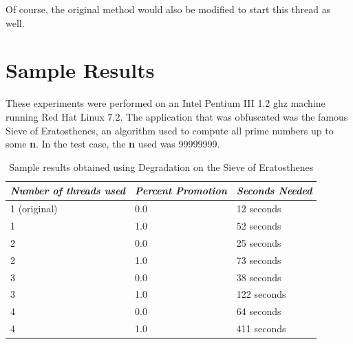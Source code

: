 
\noindent
Of course, the original method would also be modified to start this thread
as well.

\section{Sample Results}
These experiments were performed on an Intel Pentium III 1.2 ghz machine
running Red Hat Linux 7.2.  The application that was obfuscated was the famous
Sieve of Eratosthenes, an algorithm used to compute all prime numbers up to
some {\bfseries n}.  In the test case, the {\bfseries n} used was 99999999.
\begin{center}
\begin{table}[h]
\begin{center}
\begin{tabular}{| l |l| l |}
\hline
\emph{Number of threads used} & \emph{Percent Promotion} &\emph{Seconds Needed} \\
\hline
1 (original) & 0.0 & 12 seconds \\
\hline
1 & 1.0 & 52 seconds \\
\hline
2 & 0.0 & 25 seconds \\
\hline
2 & 1.0 & 73 seconds \\
\hline
3 & 0.0 & 38 seconds \\
\hline
3 & 1.0 & 122 seconds \\
\hline
4 & 0.0 & 64 seconds \\
\hline
4 & 1.0 & 411 seconds \\
\hline
\end{tabular}
\caption{Sample results obtained using Degradation on the Sieve of Eratosthenes}
\end{center}
\end{table}
\end{center}


